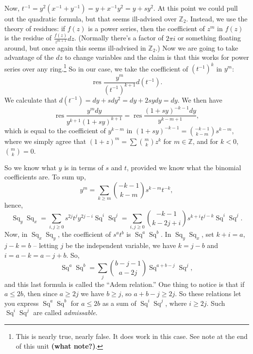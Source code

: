 \documentclass{article}
\newcommand{\Z}{\mathbb{Z}}
\DeclareMathOperator{\res}{res}
\DeclareMathOperator{\Sq}{Sq}
\theoremstyle{definition}
\begin{document}
Now, $t^{-1} = y^2(x^{-1} + y^{-1}) = y + x^{-1} y^2 = y + s y^2$.  At this point we could pull out the quadratic formula, but that seems ill-advised over $\Z_2$.  Instead, we use the theory of residues: if $f(z)$ is a power series, then the coefficient of $z^m$ in $f(z)$ is the residue of $\frac{f(z)}{z^{m+1}}dz$.  (Normally there's a factor of $2 \pi i$ or something floating around, but once again this seems ill-advised in $\Z_2$.)  Now we are going to take advantage of the $dz$ to change variables and the claim is that this works for power series over any ring.\footnote{This is nearly true, nearly false.  It does work in this case.  See note at the end of this unit \textbf{(what note?)}. %
}  So in our case, we take the coefficient of $(t^{-1})^k$ in $y^m$: \[\res \frac{y^m}{(t^{-1})^{k+1}} d(t^{-1}).\]  We calculate that $d(t^{-1}) = dy + sdy^2 = dy + 2sydy = dy$.  We then have \[\res \frac{y^m dy}{y^{k+1}(1 + sy)^{k+1}} = \res \frac{(1+sy)^{-k-1} dy}{y^{k-m+1}},\] which is equal to the coefficient of $y^{k-m}$ in $(1+sy)^{-k-1} = \binom{-k-1}{k-m}s^{k-m}$, where we simply agree that $(1 + z)^m = \sum \binom{m}{k} z^k$ for $m \in \Z$, and for $k < 0$, $\binom{m}{k} = 0$.

So we know what $y$ is in terms of $s$ and $t$, provided we know what the binomial coefficients are.  To sum up,
\[
y^m = \sum_{k \ge m} \binom{-k-1}{k-m} s^{k-m} t^{-k}
,\]
hence,
\[
\Sq_y \Sq_x = \sum_{i, j \ge 0} s^{2j} t^j y^{2j-i} \Sq^i \Sq^j = \sum_{i, j \ge 0} \binom{-k-1}{k-2j+i} s^{k+i}t^{j-k}\Sq^i\Sq^j
.\]
Now, in $\Sq_x \Sq_y$, the coefficient of $s^a t^b$ is $\Sq^a \Sq^b$.  In $\Sq_y \Sq_x$, set $k + i = a$, $j - k = b$ -- letting $j$ be the independent variable, we have $k = j - b$ and $i = a - k = a - j + b$.  So,
\[
\Sq^a \Sq^b = \sum_j \binom{b-j-1}{a-2j} \Sq^{a+b-j} \Sq^j
,\]
and this last formula is called the ``Adem relation.''  One thing to notice is that if $a \le 2b$, then since $a \ge 2j$ we have $b \ge j$, so $a + b -j \ge 2j$.  So these relations let you express $\Sq^a \Sq^b$ for $a \le 2b$ as a sum of $\Sq^i \Sq^j$, where $i \ge 2j$.  Such $\Sq^i \Sq^j$ are called \emph{admissable}.
\end{document}
